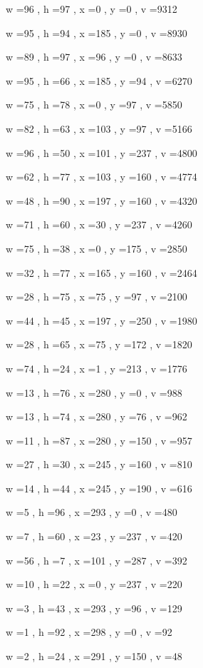 \documentclass[11pt]{article}
\begin{document}
w =96 , h =97 , x =0 , y =0 , v =9312
\par
w =95 , h =94 , x =185 , y =0 , v =8930
\par
w =89 , h =97 , x =96 , y =0 , v =8633
\par
w =95 , h =66 , x =185 , y =94 , v =6270
\par
w =75 , h =78 , x =0 , y =97 , v =5850
\par
w =82 , h =63 , x =103 , y =97 , v =5166
\par
w =96 , h =50 , x =101 , y =237 , v =4800
\par
w =62 , h =77 , x =103 , y =160 , v =4774
\par
w =48 , h =90 , x =197 , y =160 , v =4320
\par
w =71 , h =60 , x =30 , y =237 , v =4260
\par
w =75 , h =38 , x =0 , y =175 , v =2850
\par
w =32 , h =77 , x =165 , y =160 , v =2464
\par
w =28 , h =75 , x =75 , y =97 , v =2100
\par
w =44 , h =45 , x =197 , y =250 , v =1980
\par
w =28 , h =65 , x =75 , y =172 , v =1820
\par
w =74 , h =24 , x =1 , y =213 , v =1776
\par
w =13 , h =76 , x =280 , y =0 , v =988
\par
w =13 , h =74 , x =280 , y =76 , v =962
\par
w =11 , h =87 , x =280 , y =150 , v =957
\par
w =27 , h =30 , x =245 , y =160 , v =810
\par
w =14 , h =44 , x =245 , y =190 , v =616
\par
w =5 , h =96 , x =293 , y =0 , v =480
\par
w =7 , h =60 , x =23 , y =237 , v =420
\par
w =56 , h =7 , x =101 , y =287 , v =392
\par
w =10 , h =22 , x =0 , y =237 , v =220
\par
w =3 , h =43 , x =293 , y =96 , v =129
\par
w =1 , h =92 , x =298 , y =0 , v =92
\par
w =2 , h =24 , x =291 , y =150 , v =48
\par
\newpage
\end{document}
